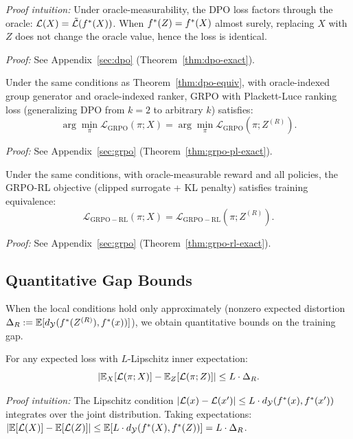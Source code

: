 \noindent\textit{Proof intuition:} Under oracle-measurability, the DPO loss factors through the oracle: $\mathcal{L}(X) = \tilde{\mathcal{L}}(f^{\ast}(X))$. When $f^{\ast}(Z) = f^{\ast}(X)$ almost surely, replacing $X$ with $Z$ does not change the oracle value, hence the loss is identical.

\noindent\textit{Proof:} See Appendix~\ref{sec:dpo} (Theorem~\ref{thm:dpo-exact}).

\begin{theorem}\label{thm:grpo-pl}
Under the same conditions as Theorem~\ref{thm:dpo-equiv}, with oracle-indexed group generator and oracle-indexed ranker, GRPO with Plackett-Luce ranking loss (generalizing DPO from $k=2$ to arbitrary $k$) satisfies:
\[
\arg\min_\pi \mathcal{L}_{\mathrm{GRPO}}(\pi; X) = \arg\min_\pi \mathcal{L}_{\mathrm{GRPO}}(\pi; Z^{(R)}).
\]
\end{theorem}

\noindent\textit{Proof:} See Appendix~\ref{sec:grpo} (Theorem~\ref{thm:grpo-pl-exact}).

\begin{theorem}\label{thm:grpo-rl}
Under the same conditions, with oracle-measurable reward and all policies, the GRPO-RL objective (clipped surrogate + KL penalty) satisfies training equivalence:
\[
\mathcal{L}_{\mathrm{GRPO-RL}}(\pi; X) = \mathcal{L}_{\mathrm{GRPO-RL}}(\pi; Z^{(R)}).
\]
\end{theorem}

\noindent\textit{Proof:} See Appendix~\ref{sec:grpo} (Theorem~\ref{thm:grpo-rl-exact}).

\subsection{Quantitative Gap Bounds}

When the local conditions hold only approximately (nonzero expected distortion $\Delta_R := \mathbb{E}[d_{\mathcal{Y}}(f^{\ast}(Z^{(R)}), f^{\ast}(x))]$), we obtain quantitative bounds on the training gap.

\begin{theorem}\label{thm:unified-gap}
For any expected loss with $L$-Lipschitz inner expectation:
\[
\left| \mathbb{E}_X[\mathcal{L}(\pi; X)] - \mathbb{E}_Z[\mathcal{L}(\pi; Z)] \right| \le L \cdot \Delta_R.
\]
\end{theorem}

\noindent\textit{Proof intuition:} The Lipschitz condition $|\mathcal{L}(x) - \mathcal{L}(x')| \le L \cdot d_{\mathcal{Y}}(f^{\ast}(x), f^{\ast}(x'))$ integrates over the joint distribution. Taking expectations: $|\mathbb{E}[\mathcal{L}(X)] - \mathbb{E}[\mathcal{L}(Z)]| \le \mathbb{E}[L \cdot d_{\mathcal{Y}}(f^{\ast}(X), f^{\ast}(Z))] = L \cdot \Delta_R$.

